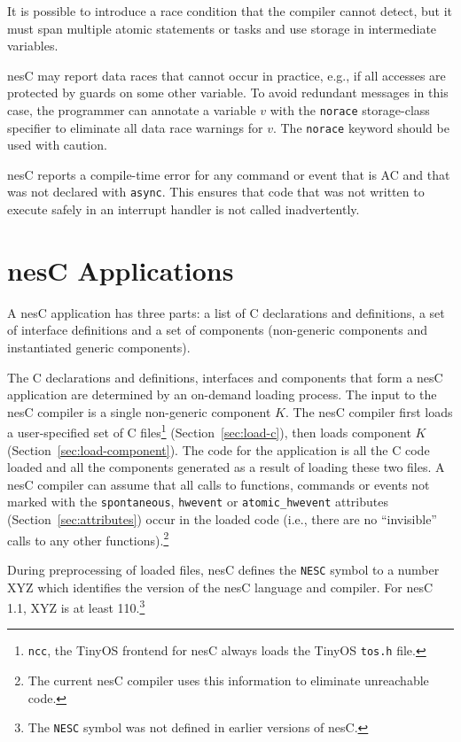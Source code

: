 \documentclass[11pt,letterpaper]{article}
\newcommand{\kw}[1]{{\tt #1}}
\newcommand{\code}[1]{{\tt #1}}
\newcommand{\file}[1]{{\tt #1}}
\newcommand{\nesc}{nesC\xspace}
\begin{document}
It is possible to introduce a race condition that the compiler cannot
detect, but it must span multiple atomic statements or tasks and use storage
in intermediate variables.

\nesc may report data races that cannot occur in practice, e.g., if all
accesses are protected by guards on some other variable. To avoid redundant
messages in this case, the programmer can annotate a variable $v$ with the
\kw{norace} storage-class specifier to eliminate all data race warnings for
$v$. The \kw{norace} keyword should be used with caution.

\nesc reports a compile-time error for any command or event that is AC and
that was not declared with \kw{async}. This ensures that code that was not
written to execute safely in an interrupt handler is not called
inadvertently.

\section{\nesc Applications}
\label{sec:app}

A \nesc application has three parts: a list of C declarations and
definitions, a set of interface definitions and a set of components
(non-generic components and instantiated generic components).

The C declarations and definitions, interfaces and components that form
a \nesc application are determined by an on-demand loading process. The
input to the \nesc compiler is a single non-generic component $K$. The
\nesc compiler first loads a user-specified set of C
files\footnote{\kw{ncc}, the TinyOS frontend for \nesc always loads the
TinyOS \file{tos.h} file.} (Section~\ref{sec:load-c}), then loads component
$K$ (Section~\ref{sec:load-component}). The code for the application is all
the C code loaded and all the components generated as a result of loading
these two files. A \nesc compiler can assume that all calls to functions,
commands or events not marked with the \code{spontaneous}, \code{hwevent}
or \code{atomic\_hwevent} attributes (Section~\ref{sec:attributes}) occur
in the loaded code (i.e., there are no ``invisible'' calls to any other
functions).\footnote{The current \nesc compiler uses this
information to eliminate unreachable code.}

During preprocessing of loaded files, \nesc defines the \kw{NESC} symbol to
a number XYZ which identifies the version of the \nesc language and compiler.
For \nesc 1.1, XYZ is at least 110.\footnote{The \kw{NESC} symbol was not
defined in earlier versions of \nesc.}
\end{document}
